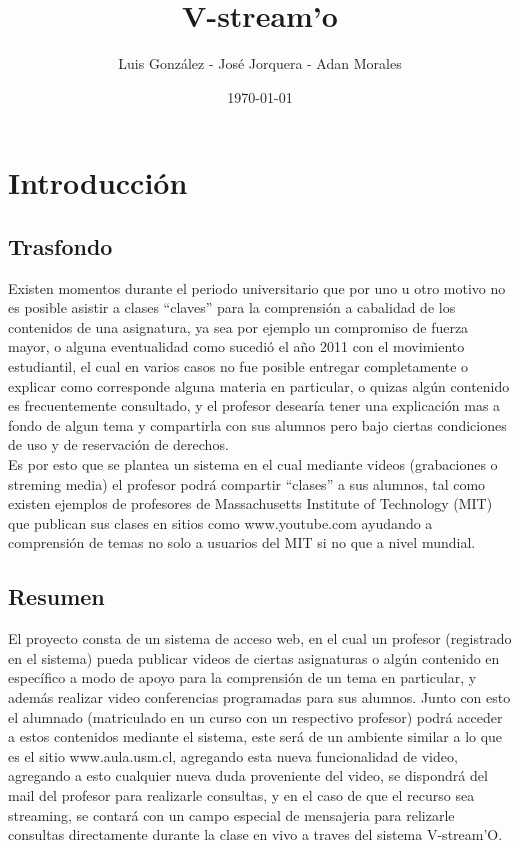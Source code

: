 \documentclass[12pt]{article}
\title{V-stream'o}
\author{Luis González - José Jorquera - Adan Morales}
\date{\today}
\begin{document}
\maketitle
\thispagestyle{empty}

\newpage
\section{Introducción}
\subsection{Trasfondo}
Existen momentos durante el periodo universitario que por uno u otro motivo no es posible asistir a clases 
``claves'' para la comprensión a cabalidad de los contenidos de una asignatura, ya sea por ejemplo un 
compromiso de fuerza mayor, o alguna eventualidad como sucedió el a\~no 2011 con el movimiento estudiantil, 
el cual en varios casos no fue posible entregar completamente o explicar como corresponde alguna materia 
en particular, o quizas algún contenido es frecuentemente consultado, y el profesor desearía tener una 
explicación mas a fondo de algun tema y compartirla con sus alumnos pero bajo ciertas condiciones de uso
y de reservación de derechos.\\
Es por esto que se plantea un sistema en el cual mediante videos (grabaciones o streming media) el profesor
podrá compartir ``clases'' a sus alumnos, tal como existen ejemplos de profesores de Massachusetts Institute of Technology (MIT) que publican sus clases en sitios como www.youtube.com ayudando a comprensión de temas
no solo a usuarios del MIT si no que a nivel mundial.

\subsection{Resumen}
El proyecto consta de un sistema de acceso web, en el cual un profesor (registrado en el sistema) pueda 
publicar videos de ciertas asignaturas o algún contenido en específico a modo de apoyo para la comprensión
de un tema en particular, y además realizar video conferencias programadas para sus alumnos. Junto con esto
el alumnado (matriculado en un curso con un respectivo profesor) podrá acceder a estos contenidos mediante
el sistema, este será de un ambiente similar a lo que es el sitio www.aula.usm.cl, agregando esta nueva
funcionalidad de video, agregando a esto cualquier nueva duda proveniente del video, se dispondrá del mail 
del profesor para realizarle consultas, y en el caso de que el recurso sea streaming, se contará con un campo
especial de mensajeria para relizarle consultas directamente durante la clase en vivo a traves del sistema
V-stream'O.
\end{document}
